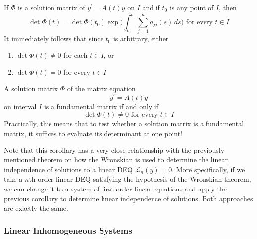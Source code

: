 \documentclass{article}
\newcounter{theorem}[section]
\begin{document}
      \begin{theorem}
        \label{thm:abels-formula}
      If $\Phi$ is a solution matrix of $y^\prime = A(t) y$ on $I$ and if $t_0$ is any point of $I$, then 
      \begin{equation}
        \det{\Phi(t)} = \det{\Phi(t_0)} \exp\bigg( \int_{t_0}^t \sum_{j=1}^n a_{jj} (s) \, ds\bigg) \text{ for every } t \in I
      \end{equation}
      It immediately follows that since $t_0$ is arbitrary, either 
      \begin{enumerate}
          \item $\det{\Phi(t)} \neq 0$ for each $t \in I$, or 
          \item $\det{\Phi(t)} = 0$ for every $t \in I$ 
      \end{enumerate}
      \end{theorem}

      \begin{corollary}
        \label{thm:solution-matrices-and-the-wronskian}
      A solution matrix $\Phi$ of the matrix equation 
      \begin{equation}
        y^\prime = A(t) y
      \end{equation}
      on interval $I$ is a fundamental matrix if and only if 
      \begin{equation}
        \det{\Phi(t)} \neq 0 \text{ for every } t \in I
      \end{equation}
      Practically, this means that to test whether a solution matrix is a fundamental matrix, it suffices to evaluate its determinant at one point! 
      \end{corollary}

      Note that this corollary has a very close relationship with the previously mentioned theorem on how the \hyperref[def:wronskian]{Wronskian} is used to determine the \hyperref[lin-def:linear-independence]{linear independence} of solutions to a linear DEQ $\mathcal{L}_n (y) = 0$. More specifically, if we take a $n$th order linear DEQ satisfying the hypothesis of the Wronskian theorem, we can change it to a system of first-order linear equations and apply the previous corollary to determine linear independence of solutions. Both approaches are exactly the same. 

    \subsubsection{Linear Inhomogeneous Systems}
\end{document}

